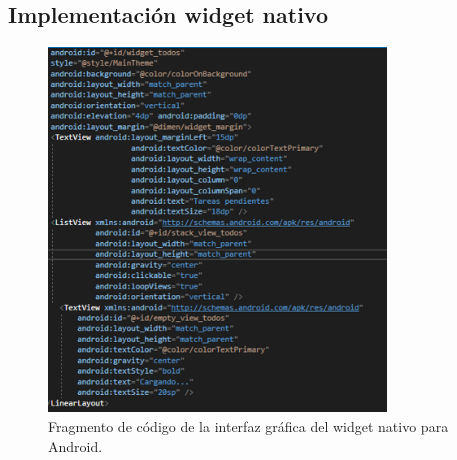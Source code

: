 \documentclass[10pt]{article}
\begin{document}
\subsection{Implementación widget nativo}
\begin{figure}[H]
    \begin{center}
        \includegraphics[width=0.8\textwidth]{Imagenes/widget.png}
        \caption{Fragmento de código de la interfaz gráfica del widget nativo para Android.}
        \label{fig1}
    \end{center}
\end{figure}
\end{document}
